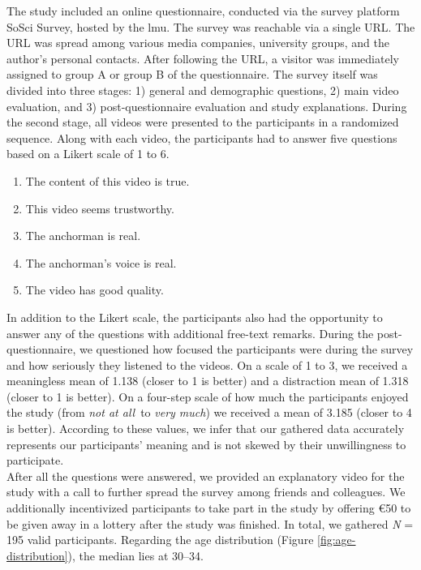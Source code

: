 \documentclass[
  a4paper,  %
  twoside,  %
  bibliography=totoc,
  headsepline,
  cleardoublepage=empty,
  parskip=half,
  draft=false
]{scrbook}
\begin{document}
The study included an online questionnaire, conducted via the survey platform SoSci Survey, hosted by the \gls{lmu}. The survey was reachable via a single URL. The URL was spread among various media companies, university groups, and the author's personal contacts. After following the URL, a visitor was immediately assigned to group A or group B of the questionnaire. The survey itself was divided into three stages: 1) general and demographic questions, 2) main video evaluation, and 3) post-questionnaire evaluation and study explanations. During the second stage, all videos were presented to the participants in a randomized sequence. Along with each video, the participants had to answer five questions based on a Likert scale of 1 to 6.
\begin{enumerate}
  \item The content of this video is true.
  \item This video seems trustworthy.
  \item The anchorman is real.
  \item The anchorman's voice is real.
  \item The video has good quality.
\end{enumerate}
In addition to the Likert scale, the participants also had the opportunity to answer any of the questions with additional free-text remarks. During the post-questionnaire, we questioned how focused the participants were during the survey and how seriously they listened to the videos. On a scale of 1 to 3, we received a meaningless mean of 1.138 (closer to 1 is better) and a distraction mean of 1.318 (closer to 1 is better). On a four-step scale of how much the participants enjoyed the study (from \textit{not at all} to \textit{very much}) we received a mean of 3.185 (closer to 4 is better). According to these values, we infer that our gathered data accurately represents our participants' meaning and is not skewed by their unwillingness to participate. \\
After all the questions were answered, we provided an explanatory video for the study with a call to further spread the survey among friends and colleagues. We additionally incentivized participants to take part in the study by offering €50 to be given away in a lottery after the study was finished.
In total, we gathered \textit{N} = 195 valid participants. Regarding the age distribution (Figure \ref{fig:age-distribution}), the median lies at 30–34.
\end{document}
